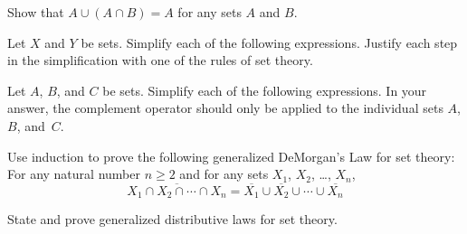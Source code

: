 \begin{exercises}
\problem Show that $A\cup (A\cap B)= A$ for any sets $A$ and $B$.

\problem Let $X$ and $Y$ be sets.  Simplify each of the
following expressions.  Justify each step in the simplification
with one of the rules of set theory.

\problem Let $A$, $B$, and $C$ be sets.  Simplify each of the following
expressions.  In your answer, the complement operator should only
be applied to the individual sets $A$, $B$, and~$C$.

\problem Use induction to prove the following generalized DeMorgan's Law
for set theory: 
For any natural number $n\geq 2$ and for any sets $X_1$, $X_2$, \dots, $X_n$,
\[\overline{X_1\cap X_2\cap \cdots \cap X_n} =
     \overline{X_1} \cup \overline{X_2} \cup\cdots\cup \overline{X_n}\]

\problem State and prove generalized distributive laws for set theory.


\end{exercises}



